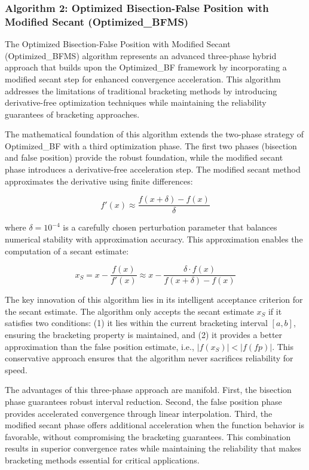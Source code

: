 \documentclass[amsmath, amssymb, aps]{revtex4-2}
\begin{document}
\subsubsection{Algorithm 2: Optimized Bisection-False Position with Modified Secant (Optimized\_BFMS)}

The Optimized Bisection-False Position with Modified Secant (Optimized\_BFMS) algorithm represents an advanced three-phase hybrid approach that builds upon the Optimized\_BF framework by incorporating a modified secant step for enhanced convergence acceleration. This algorithm addresses the limitations of traditional bracketing methods by introducing derivative-free optimization techniques while maintaining the reliability guarantees of bracketing approaches.

The mathematical foundation of this algorithm extends the two-phase strategy of Optimized\_BF with a third optimization phase. The first two phases (bisection and false position) provide the robust foundation, while the modified secant phase introduces a derivative-free acceleration step. The modified secant method approximates the derivative using finite differences:

\begin{equation}
f'(x) \approx \frac{f(x + \delta) - f(x)}{\delta}
\end{equation}

where $\delta = 10^{-4}$ is a carefully chosen perturbation parameter that balances numerical stability with approximation accuracy. This approximation enables the computation of a secant estimate:

\begin{equation}
x_S = x - \frac{f(x)}{f'(x)} \approx x - \frac{\delta \cdot f(x)}{f(x + \delta) - f(x)}
\end{equation}

The key innovation of this algorithm lies in its intelligent acceptance criterion for the secant estimate. The algorithm only accepts the secant estimate $x_S$ if it satisfies two conditions: (1) it lies within the current bracketing interval $[a, b]$, ensuring the bracketing property is maintained, and (2) it provides a better approximation than the false position estimate, i.e., $|f(x_S)| < |f(fp)|$. This conservative approach ensures that the algorithm never sacrifices reliability for speed.

The advantages of this three-phase approach are manifold. First, the bisection phase guarantees robust interval reduction. Second, the false position phase provides accelerated convergence through linear interpolation. Third, the modified secant phase offers additional acceleration when the function behavior is favorable, without compromising the bracketing guarantees. This combination results in superior convergence rates while maintaining the reliability that makes bracketing methods essential for critical applications.
\end{document}
